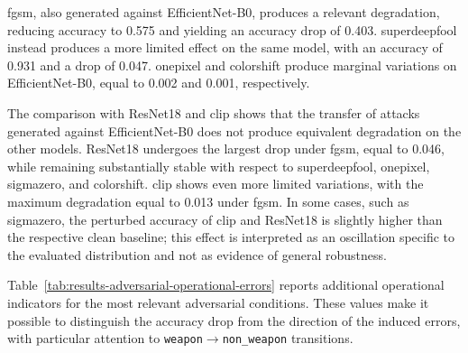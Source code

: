 \gls{fgsm}, also generated against EfficientNet-B0, produces a relevant
degradation, reducing accuracy to 0.575 and yielding an accuracy drop of 0.403.
\gls{superdeepfool} instead produces a more limited effect on the same model,
with an accuracy of 0.931 and a drop of 0.047. \gls{onepixel} and
\gls{colorshift} produce marginal variations on EfficientNet-B0, equal to
0.002 and 0.001, respectively.

The comparison with ResNet18 and \gls{clip} shows that the transfer of attacks
generated against EfficientNet-B0 does not produce equivalent degradation on
the other models. ResNet18 undergoes the largest drop under \gls{fgsm}, equal
to 0.046, while remaining substantially stable with respect to
\gls{superdeepfool}, \gls{onepixel}, \gls{sigmazero}, and \gls{colorshift}.
\gls{clip} shows even more limited variations, with the maximum degradation
equal to 0.013 under \gls{fgsm}. In some cases, such as \gls{sigmazero}, the
perturbed accuracy of \gls{clip} and ResNet18 is slightly higher than the
respective clean baseline; this effect is interpreted as an oscillation
specific to the evaluated distribution and not as evidence of general
robustness.

Table~\ref{tab:results-adversarial-operational-errors} reports additional
operational indicators for the most relevant adversarial conditions. These
values make it possible to distinguish the accuracy drop from the direction of
the induced errors, with particular attention to
\texttt{weapon}\(\rightarrow\)\texttt{non\_weapon} transitions.

